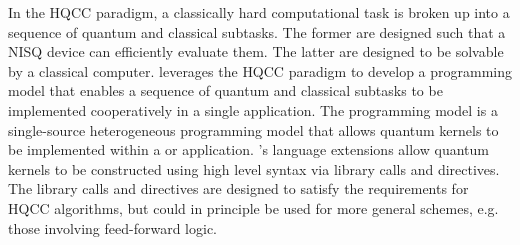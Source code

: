 In the \ac{HQCC} paradigm, a classically hard computational task is broken up into a sequence of quantum and classical subtasks. The former are designed such that a \ac{NISQ} device can efficiently evaluate them. The latter are designed to be solvable by a classical computer. 
\qcor leverages the \ac{HQCC} paradigm to develop a programming model that enables a sequence of quantum and classical subtasks to be implemented cooperatively in a single application. The \qcor programming model is a single-source heterogeneous programming model that allows quantum kernels to be implemented within a \Clang or \Cpp application. \qcor's language extensions allow quantum kernels to be constructed using high level \CorCpp syntax via library calls and directives. The library calls and directives are designed to satisfy the requirements for \ac{HQCC} algorithms, but could in principle be used for more general schemes, e.g. those involving feed-forward logic. 
